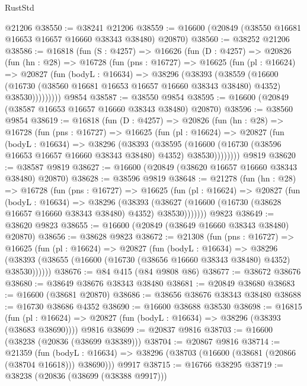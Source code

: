 \begin{lexlean}{RustStd}
\begin{coremodule}
{\begin{coremodule}
{{{{{{{{{{{{{{{{{{{{{{{{{{{{{{{{{{{{{{{{{{{{{{{{{{{{{{{    @21206
@38550 := @38241 @21206
@38559 := @16600 (@20849 (@38550 @16681 @16653 @16657 @16660 @38343 @38480) @20870)
@38560 := @38252 @21206
@38586 := @16818
    (fun (S : @4257) =>
    @16626
      (fun (D : @4257) =>
      @20826
        (fun (hn : @28) =>
        @16728
          (fun (pns : @16727) =>
          @16625
            (fun (pl : @16624) =>
            @20827
              (fun (bodyL : @16634) =>
              @38296
                (@38393
                  (@38559
                    (@16600
                      (@16730 (@38560 @16681 @16653 @16657 @16660 @38343 @38480) @4352)
                      @38530)))))))))
    @9854
@38587 := @38550 @9854
@38595 := @16600 (@20849 (@38587 @16653 @16657 @16660 @38343 @38480) @20870)
@38596 := @38560 @9854
@38619 := @16818
    (fun (D : @4257) =>
    @20826
      (fun (hn : @28) =>
      @16728
        (fun (pns : @16727) =>
        @16625
          (fun (pl : @16624) =>
          @20827
            (fun (bodyL : @16634) =>
            @38296
              (@38393
                (@38595
                  (@16600 (@16730 (@38596 @16653 @16657 @16660 @38343 @38480) @4352) @38530))))))))
    @9819
@38620 := @38587 @9819
@38627 := @16600 (@20849 (@38620 @16657 @16660 @38343 @38480) @20870)
@38628 := @38596 @9819
@38648 := @21278
    (fun (hn : @28) =>
    @16728
      (fun (pns : @16727) =>
      @16625
        (fun (pl : @16624) =>
        @20827
          (fun (bodyL : @16634) =>
          @38296
            (@38393
              (@38627 (@16600 (@16730 (@38628 @16657 @16660 @38343 @38480) @4352) @38530)))))))
    @9823
@38649 := @38620 @9823
@38655 := @16600 (@20849 (@38649 @16660 @38343 @38480) @20870)
@38656 := @38628 @9823
@38672 := @21308
    (fun (pns : @16727) =>
    @16625
      (fun (pl : @16624) =>
      @20827
        (fun (bodyL : @16634) =>
        @38296 (@38393 (@38655 (@16600 (@16730 (@38656 @16660 @38343 @38480) @4352) @38530))))))
@38676 := @84 @415 (@84 @9808 @86)
@38677 := @38672 @38676
@38680 := @38649 @38676 @38343 @38480
@38681 := @20849 @38680
@38683 := @16600 (@38681 @20870)
@38686 := @38656 @38676 @38343 @38480
@38688 := @16730 @38686 @4352
@38690 := @16600 @38688 @38530
@38698 := @16815
    (fun (pl : @16624) => @20827 (fun (bodyL : @16634) => @38296 (@38393 (@38683 @38690))))
    @9816
@38699 := @20837 @9816
@38703 := @16600 (@38238 (@20836 (@38699 @38389)))
@38704 := @20867 @9816
@38714 := @21359
    (fun (bodyL : @16634) => @38296 (@38703 (@16600 (@38681 (@20866 (@38704 @16618))) @38690)))
    @9917
@38715 := @16766 @38295
@38719 := @38238 (@20836 (@38699 (@38388 @9917)))
}}}}}}}}}}}}}}}}}}}}}}}}}}}}}}}}}}}}}}}}}}}}}}}}}}}}}}}
\end{coremodule}}
\end{coremodule}
\end{lexlean}
